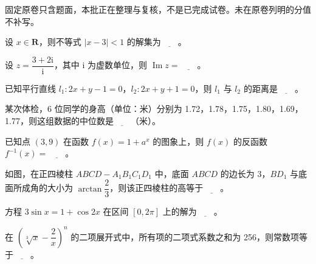 

\begin{gktip}
固定原卷只含题面，本批正在整理与复核，不是已完成试卷。未在原卷列明的分值不补写。
\end{gktip}


\begin{question}
设 \(x\in\mathbf{R}\)，则不等式 \(|x-3|<1\) 的解集为\(\underline{\qquad}\)。

\end{question}
\begin{question}
设 \(z=\dfrac{3+2\mathrm{i}}{\mathrm{i}}\)，其中 \(\mathrm{i}\) 为虚数单位，则 \(\operatorname{Im}z=\)\(\underline{\qquad}\)。

\end{question}
\begin{question}
已知平行直线 \(l_1:2x+y-1=0\)，\(l_2:2x+y+1=0\)，则 \(l_1\) 与 \(l_2\) 的距离是\(\underline{\qquad}\)。

\end{question}
\begin{question}
某次体检，6 位同学的身高（单位：米）分别为 1.72，1.78，1.75，1.80，1.69，1.77，则这组数据的中位数是\(\underline{\qquad}\)（米）。

\end{question}
\begin{question}
已知点 \((3,9)\) 在函数 \(f(x)=1+a^x\) 的图象上，则 \(f(x)\) 的反函数 \(f^{-1}(x)=\)\(\underline{\qquad}\)。

\Needspace{0.4\textheight}
\end{question}
\begin{question}
如图，在正四棱柱 \(ABCD-A_1B_1C_1D_1\) 中，底面 \(ABCD\) 的边长为 3，\(BD_1\) 与底面所成角的大小为 \(\arctan\dfrac{2}{3}\)，则该正四棱柱的高等于\(\underline{\qquad}\)。
\nopagebreak[4]
\begin{center}\end{center}
\nopagebreak[4]
\end{question}
\begin{question}
方程 \(3\sin x=1+\cos 2x\) 在区间 \([0,2\pi]\) 上的解为\(\underline{\qquad}\)。

\end{question}
\begin{question}
在 \(\left(\sqrt[3]{x}-\dfrac{2}{x}\right)^n\) 的二项展开式中，所有项的二项式系数之和为 256，则常数项等于\(\underline{\qquad}\)。

\end{question}
